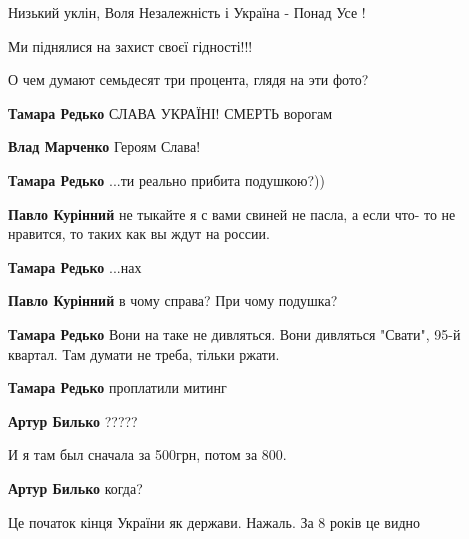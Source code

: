  
 
 
 
 

Низький уклін, Воля Незалежність і Україна - Понад Усе !

Ми піднялися на захист своєї гідності!!!

О чем думают семьдесят три процента, глядя на эти фото?

\begin{itemize} %
\textbf{Тамара Редько} СЛАВА УКРАЇНІ! СМЕРТЬ ворогам

\textbf{Влад Марченко} Героям Слава!

\textbf{Тамара Редько} ...ти реально прибита подушкою?))

\textbf{Павло Курінний} не тыкайте я с вами свиней не пасла, а если что- то не нравится, то таких как вы ждут на россии.

\textbf{Тамара Редько} ...нах

\textbf{Павло Курінний} в чому справа? При чому подушка?

\textbf{Тамара Редько} Вони на таке не дивляться. Вони дивляться "Свати", 95-й квартал. Там думати не треба, тільки ржати.

\textbf{Тамара Редько} проплатили митинг

\textbf{Артур Билько} ?????

И я там был сначала за 500грн, потом за 800.

\textbf{Артур Билько} когда?

\end{itemize} %


Це початок кінця України як держави. Нажаль. За 8 років це видно

